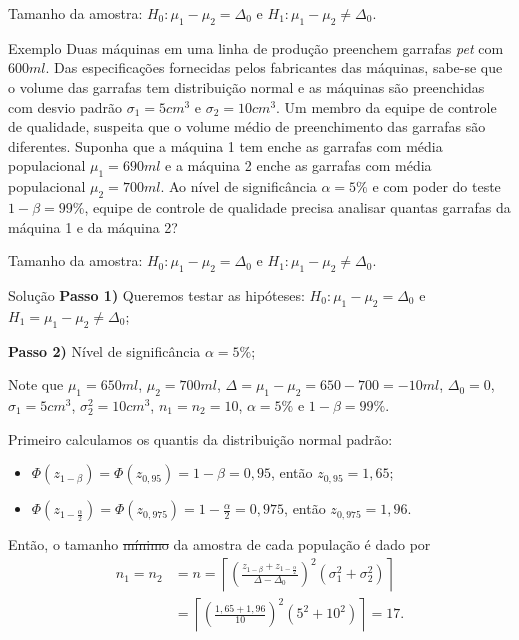 \documentclass[9pt]{beamer}
\begin{document}
\begin{frame}{Tamanho da amostra: $H_0:\mu_1 - \mu_2 = \Delta_0$ e $H_1: \mu_1 - \mu_2 \neq \Delta_0$.}

\begin{block}{Exemplo}
	Duas máquinas em uma linha de produção preenchem garrafas \textit{pet} com $600ml$. Das especificações fornecidas pelos fabricantes das máquinas, sabe-se que o volume das garrafas tem distribuição normal e as máquinas são preenchidas com desvio padrão $\sigma_1=5cm^3$ e $\sigma_2=10cm^3$. Um membro da equipe de controle de qualidade, suspeita que o volume médio de preenchimento das garrafas são diferentes. Suponha que a máquina 1 tem enche as garrafas com média populacional $\mu_1=690ml$ e a máquina 2 enche as garrafas com média populacional $\mu_2=700ml$. Ao nível de significância $\alpha=5\%$ e com poder do teste $1-\beta=99\%$, equipe de controle de qualidade precisa analisar quantas garrafas da máquina 1 e da máquina 2?	
\end{block}
\end{frame}

\begin{frame}{Tamanho da amostra: $H_0:\mu_1 - \mu_2 = \Delta_0$ e $H_1: \mu_1 - \mu_2 \neq \Delta_0$.}

\normalsize

\begin{block}{Solução}
	\textbf{Passo 1)} Queremos testar as hipóteses: $H_0: \mu_1 - \mu_2 = \Delta_0$ e $H_1= \mu_1 - \mu_2 \neq \Delta_0$;
	
	\textbf{Passo 2)} Nível de significância $\alpha=5\%$;
	
	Note que $\mu_1=650ml$, $\mu_2=700ml$, $\Delta=\mu_1-\mu_2=650-700=-10ml$, $\Delta_0=0$, $\sigma_1=5cm^3$, $\sigma_2^2 = 10cm^3$, $n_1=n_2=10$, $\alpha = 5\%$ e $1-\beta=99\%$. 
	
	Primeiro calculamos os quantis da distribuição normal padrão:
	\begin{itemize}
		\item $\Phi\left(z_{1-\beta}\right)=\Phi\left(z_{0,95}\right) = 1-\beta=0,95$, então $z_{0,95} = 1,65$;
		\item $\Phi\left(z_{1-\frac{\alpha}{2}}\right)=\Phi\left(z_{0,975}\right) = 1-\frac{\alpha}{2}=0,975$, então $z_{0,975} = 1,96$.
	\end{itemize}

	Então, o tamanho \sout{mínimo} da amostra de cada população é dado por
	\begin{align*}
	n_1=n_2&=n=\left\lceil \left( \frac{z_{1-\beta} + z_{1-\frac{\alpha}{2}}}{ \Delta - \Delta_0 } \right)^2 (\sigma_1^2 + \sigma_2^2) \right\rceil\\
	&= \left\lceil \left( \frac{1,65 + 1,96}{10} \right)^2 (5^2 + 10^2)  \right\rceil = 17.
	\end{align*}
\end{block}

\normalsize
\end{frame}
\end{document}
